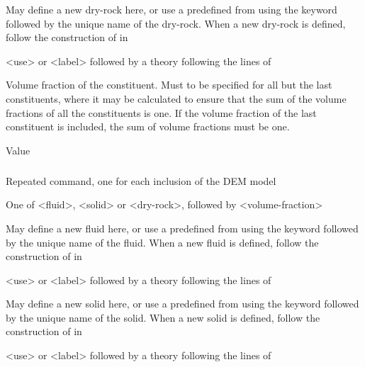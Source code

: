 {
 \slist
   \item \Description  May define a new dry-rock here, or use a predefined  from  using the keyword  followed by the unique name of the dry-rock. When a new dry-rock is defined, follow the construction of  in 
   \item \Argument <use> or <label> followed by a theory following the lines of 
   \item \Default
 \elist

 \slist
   \item \Description Volume fraction of the constituent. Must to be specified for all but the last constituents, where it may be calculated to ensure that the sum of the volume fractions of all the constituents is one. If the volume fraction of the last constituent is included, the sum of volume fractions must be one.
   \item \Argument Value
   \item \Default
 \elist

\subparagraph{}
 \slist
   \item \Description Repeated command, one for each inclusion of the DEM model
   \item \Argument One of <fluid>, <solid> or <dry-rock>, followed by <volume-fraction>
   \item \Default
 \elist

 \slist
   \item \Description May define a new fluid here, or use a predefined  from  using the keyword  followed by the unique name of the fluid. When a new fluid is defined, follow the construction of  in 
   \item \Argument <use> or <label> followed by a theory following the lines of 
   \item \Default
 \elist

 \slist
   \item \Description May define a new solid here, or use a predefined  from  using the keyword  followed by the unique name of the solid. When a new solid is defined, follow the construction of  in 
   \item \Argument <use> or <label> followed by a theory following the lines of 
   \item \Default
 \elist

}

